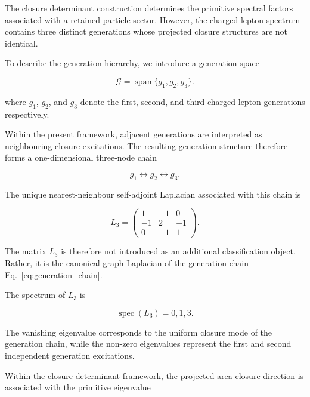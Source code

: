 \documentclass[11pt]{article}
\theoremstyle{definition}
\theoremstyle{remark}
\begin{document}
The closure determinant construction determines the primitive
spectral factors associated with a retained particle sector.
However, the charged-lepton spectrum contains three distinct
generations whose projected closure structures are not
identical.

To describe the generation hierarchy, we introduce a
generation space

\begin{equation}
\mathcal G
=
\operatorname{span}
\{g_1,g_2,g_3\}.
\end{equation}

where \(g_1\), \(g_2\), and \(g_3\) denote the first, second,
and third charged-lepton generations respectively.

Within the present framework, adjacent generations are
interpreted as neighbouring closure excitations. The resulting
generation structure therefore forms a one-dimensional
three-node chain

\begin{equation}
g_1
\longleftrightarrow
g_2
\longleftrightarrow
g_3.
\label{eq:generation_chain}
\end{equation}

The unique nearest-neighbour self-adjoint Laplacian associated
with this chain is

\begin{equation}
L_3
=
\begin{pmatrix}
1 & -1 & 0 \\
-1 & 2 & -1 \\
0 & -1 & 1
\end{pmatrix}.
\label{eq:L3}
\end{equation}

The matrix \(L_3\) is therefore not introduced as an additional
classification object. Rather, it is the canonical graph
Laplacian of the generation chain
Eq.~\eqref{eq:generation_chain}.

The spectrum of \(L_3\) is

\begin{equation}
\operatorname{spec}(L_3) =
{0,1,3}.
\label{eq:L3Spectrum}
\end{equation}

The vanishing eigenvalue corresponds to the uniform closure
mode of the generation chain, while the non-zero eigenvalues
represent the first and second independent generation
excitations.

Within the closure determinant framework, the projected-area
closure direction is associated with the primitive eigenvalue
\end{document}
